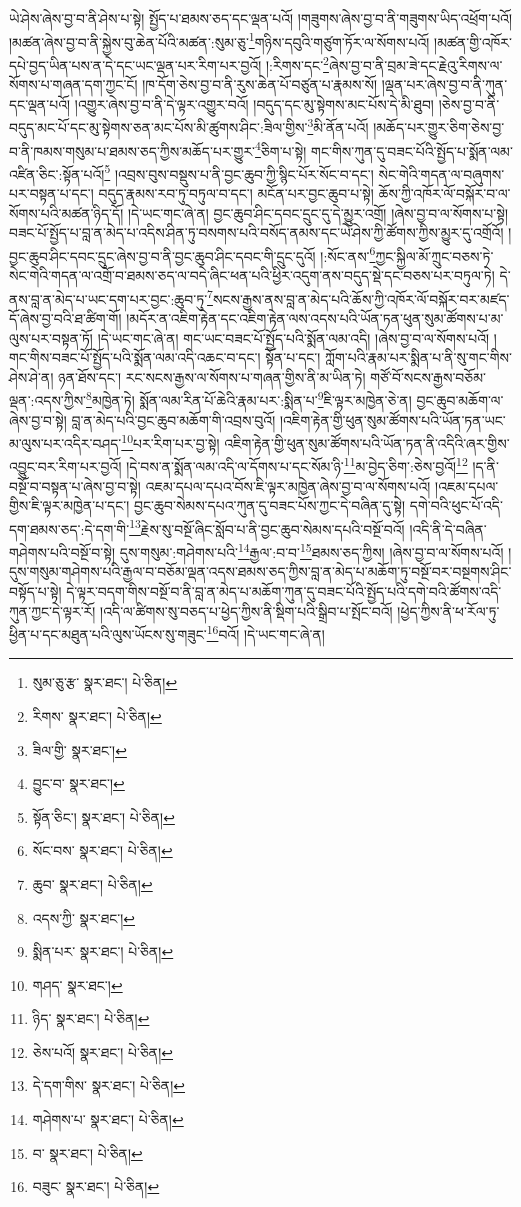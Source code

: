 ཡེ་ཤེས་ཞེས་བྱ་བ་ནི་ཤེས་པ་སྟེ། སྤྱོད་པ་ཐམས་ཅད་དང་ལྡན་པའོ། །གཟུགས་ཞེས་བྱ་བ་ནི་གཟུགས་ཡིད་འཕྲོག་པའོ། །མཚན་ཞེས་བྱ་བ་ནི་སྐྱེས་བུ་ཆེན་པོའི་མཚན་:སུམ་ཅུ་\footnote{སུམ་ཅུ་རྩ་  སྣར་ཐང་།  པེ་ཅིན། }གཉིས་དབུའི་གཙུག་ཏོར་ལ་སོགས་པའོ། །མཚན་གྱི་འཁོར་དཔེ་བྱད་ཡིན་པས་ན་དེ་དང་ཡང་ལྡན་པར་རིག་པར་བྱའོ། །:རིགས་དང་\footnote{རིགས་  སྣར་ཐང་།  པེ་ཅིན། }ཞེས་བྱ་བ་ནི་བྲམ་ཟེ་དང་རྗེའུ་རིགས་ལ་སོགས་པ་གཞན་དག་ཀྱང་ངོ། །ཁ་དོག་ཅེས་བྱ་བ་ནི་རུས་ཆེན་པོ་བཙུན་པ་རྣམས་སོ། །ལྡན་པར་ཞེས་བྱ་བ་ནི་ཀུན་དང་ལྡན་པའོ། །འགྱུར་ཞེས་བྱ་བ་ནི་དེ་ལྟར་འགྱུར་བའོ། །བདུད་དང་མུ་སྟེགས་མང་པོས་དེ་མི་ཐུབ། །ཅེས་བྱ་བ་ནི་བདུད་མང་པོ་དང་མུ་སྟེགས་ཅན་མང་པོས་མི་ཚུགས་ཤིང་:ཟིལ་གྱིས་\footnote{ཟིལ་གྱི་  སྣར་ཐང་། }མི་ནོན་པའོ། །མཆོད་པར་གྱུར་ཅིག་ཅེས་བྱ་བ་ནི་ཁམས་གསུམ་པ་ཐམས་ཅད་ཀྱིས་མཆོད་པར་གྱུར་\footnote{བྱུང་བ་  སྣར་ཐང་། }ཅིག་པ་སྟེ། གང་གིས་ཀུན་དུ་བཟང་པོའི་སྤྱོད་པ་སྨོན་ལམ་འཛིན་ཅིང་:སྟོན་པའོ།\footnote{སྟོན་ཅིང་།  སྣར་ཐང་།  པེ་ཅིན། } །འབྲས་བུས་བསྡུས་པ་ནི་བྱང་ཆུབ་ཀྱི་སྙིང་པོར་སོང་བ་དང་། སེང་གེའི་གདན་ལ་བཞུགས་པར་བསྟན་པ་དང་། བདུད་རྣམས་རབ་ཏུ་བཏུལ་བ་དང་། མངོན་པར་བྱང་ཆུབ་པ་སྟེ། ཆོས་ཀྱི་འཁོར་ལོ་བསྐོར་བ་ལ་སོགས་པའི་མཚན་ཉིད་དོ། །དེ་ཡང་གང་ཞེ་ན། བྱང་ཆུབ་ཤིང་དབང་དྲུང་དུ་དེ་མྱུར་འགྲོ། །ཞེས་བྱ་བ་ལ་སོགས་པ་སྟེ། བཟང་པོ་སྤྱོད་པ་བླ་ན་མེད་པ་འདིས་ཤིན་ཏུ་བསགས་པའི་བསོད་ནམས་དང་ཡེ་ཤེས་ཀྱི་ཚོགས་ཀྱིས་མྱུར་དུ་འགྲོའོ། །བྱང་ཆུབ་ཤིང་དབང་དྲུང་ཞེས་བྱ་བ་ནི་བྱང་ཆུབ་ཤིང་དབང་གི་དྲུང་དུའོ། །:སོང་ནས་\footnote{སོང་བས་  སྣར་ཐང་།  པེ་ཅིན། }ཀྱང་སྐྱིལ་མོ་ཀྲུང་བཅས་ཏེ་སེང་གེའི་གདན་ལ་འགྲོ་བ་ཐམས་ཅད་ལ་བདེ་ཞིང་ཕན་པའི་ཕྱིར་འདུག་ནས་བདུད་སྡེ་དང་བཅས་པར་བཏུལ་ཏེ། དེ་ནས་བླ་ན་མེད་པ་ཡང་དག་པར་བྱང་:ཆུབ་ཏུ་\footnote{ཆུབ་  སྣར་ཐང་།  པེ་ཅིན། }སངས་རྒྱས་ནས་བླ་ན་མེད་པའི་ཆོས་ཀྱི་འཁོར་ལོ་བསྐོར་བར་མཛད་དོ་ཞེས་བྱ་བའི་ཐ་ཚིག་གོ། །མདོར་ན་འཇིག་རྟེན་དང་འཇིག་རྟེན་ལས་འདས་པའི་ཡོན་ཏན་ཕུན་སུམ་ཚོགས་པ་མ་ལུས་པར་བསྟན་ཏོ། །དེ་ཡང་གང་ཞེ་ན། གང་ཡང་བཟང་པོ་སྤྱོད་པའི་སྨོན་ལམ་འདི། །ཞེས་བྱ་བ་ལ་སོགས་པའོ། །གང་གིས་བཟང་པོ་སྤྱོད་པའི་སྨོན་ལམ་འདི་འཆང་བ་དང་། སྟོན་པ་དང་། ཀློག་པའི་རྣམ་པར་སྨིན་པ་ནི་སུ་གང་གིས་ཤེས་ཤེ་ན། ཉན་ཐོས་དང་། རང་སངས་རྒྱས་ལ་སོགས་པ་གཞན་གྱིས་ནི་མ་ཡིན་ཏེ། གཙོ་བོ་སངས་རྒྱས་བཅོམ་ལྡན་:འདས་ཀྱིས་\footnote{འདས་ཀྱི་  སྣར་ཐང་། }མཁྱེན་ཏེ། སྨོན་ལམ་རིན་པོ་ཆེའི་རྣམ་པར་:སྨིན་པ་\footnote{སྨིན་པར་  སྣར་ཐང་།  པེ་ཅིན། }ཇི་ལྟར་མཁྱེན་ཅེ་ན། བྱང་ཆུབ་མཆོག་ལ་ཞེས་བྱ་བ་སྟེ། བླ་ན་མེད་པའི་བྱང་ཆུབ་མཆོག་གི་འབྲས་བུའོ། །འཇིག་རྟེན་གྱི་ཕུན་སུམ་ཚོགས་པའི་ཡོན་ཏན་ཡང་མ་ལུས་པར་འདིར་བཤད་\footnote{གཤད་  སྣར་ཐང་། }པར་རིག་པར་བྱ་སྟེ། འཇིག་རྟེན་གྱི་ཕུན་སུམ་ཚོགས་པའི་ཡོན་ཏན་ནི་འདིའི་ཞར་གྱིས་འབྱུང་བར་རིག་པར་བྱའོ། །དེ་བས་ན་སྨོན་ལམ་འདི་ལ་དོགས་པ་དང་སོམ་ཉི་\footnote{ཉིད་  སྣར་ཐང་།  པེ་ཅིན། }མ་བྱེད་ཅིག་:ཅེས་བྱའོ།\footnote{ཅེས་པའོ།  སྣར་ཐང་།  པེ་ཅིན། } །ད་ནི་བསྔོ་བ་བསྟན་པ་ཞེས་བྱ་བ་སྟེ། འཇམ་དཔལ་དཔའ་བོས་ཇི་ལྟར་མཁྱེན་ཞེས་བྱ་བ་ལ་སོགས་པའོ། །འཇམ་དཔལ་གྱིས་ཇི་ལྟར་མཁྱེན་པ་དང་། བྱང་ཆུབ་སེམས་དཔའ་ཀུན་དུ་བཟང་པོས་ཀྱང་དེ་བཞིན་དུ་སྟེ། དགེ་བའི་ཕུང་པོ་འདི་དག་ཐམས་ཅད་:དེ་དག་གི་\footnote{དེ་དག་གིས་  སྣར་ཐང་།  པེ་ཅིན། }རྗེས་སུ་བསྔོ་ཞིང་སློབ་པ་ནི་བྱང་ཆུབ་སེམས་དཔའི་བསྔོ་བའོ། །འདི་ནི་དེ་བཞིན་གཤེགས་པའི་བསྔོ་བ་སྟེ། དུས་གསུམ་:གཤེགས་པའི་\footnote{གཤེགས་པ་  སྣར་ཐང་།  པེ་ཅིན། }རྒྱལ་:བ་བ་\footnote{བ་  སྣར་ཐང་།  པེ་ཅིན། }ཐམས་ཅད་ཀྱིས། །ཞེས་བྱ་བ་ལ་སོགས་པའོ། །དུས་གསུམ་གཤེགས་པའི་རྒྱལ་བ་བཅོམ་ལྡན་འདས་ཐམས་ཅད་ཀྱིས་བླ་ན་མེད་པ་མཆོག་ཏུ་བསྔོ་བར་བསྔགས་ཤིང་བསྟོད་པ་སྟེ། དེ་ལྟར་བདག་གིས་བསྔོ་བ་ནི་བླ་ན་མེད་པ་མཆོག་ཀུན་དུ་བཟང་པོའི་སྤྱོད་པའི་དགེ་བའི་ཚོགས་འདི་ཀུན་ཀྱང་དེ་ལྟར་རོ། །འདི་ལ་ཚིགས་སུ་བཅད་པ་ཕྱེད་ཀྱིས་ནི་སྡིག་པའི་སྒྲིབ་པ་སྤོང་བའོ། །ཕྱེད་ཀྱིས་ནི་ཕ་རོལ་ཏུ་ཕྱིན་པ་དང་མཐུན་པའི་ལུས་ཡོངས་སུ་གཟུང་\footnote{བཟུང་  སྣར་ཐང་།  པེ་ཅིན། }བའོ། །དེ་ཡང་གང་ཞེ་ན། 